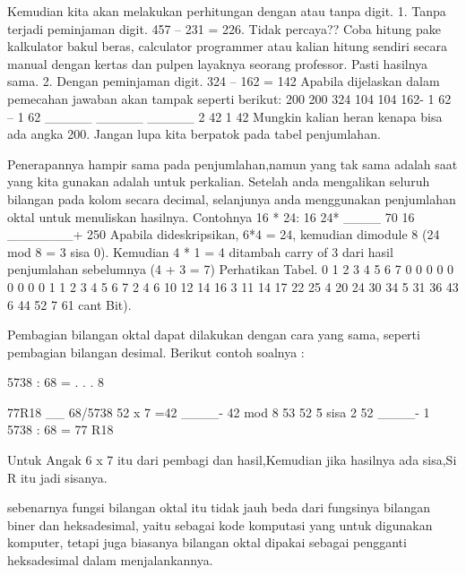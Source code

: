 Kemudian kita akan melakukan perhitungan dengan atau tanpa digit.  
1.	Tanpa terjadi peminjaman digit.
457 – 231 = 226. Tidak percaya?? Coba hitung pake kalkulator bakul beras, calculator programmer atau kalian hitung sendiri secara manual dengan kertas dan pulpen layaknya seorang professor. Pasti hasilnya sama.
2.	Dengan peminjaman digit.
324 – 162 = 142
Apabila dijelaskan dalam pemecahan jawaban akan tampak seperti berikut:
                                200                                         200
324                           104                                          104
162-                       1  62 –                                    1   62
_____                   _____                                   _____
    2                              42                                       1   42
Mungkin kalian heran kenapa bisa ada angka 200. Jangan lupa kita berpatok pada tabel penjumlahan.
	
Penerapannya hampir sama pada penjumlahan,namun yang tak sama adalah saat yang kita gunakan adalah untuk perkalian. Setelah anda mengalikan seluruh bilangan pada kolom secara decimal, selanjunya anda menggunakan penjumlahan oktal untuk menuliskan hasilnya.
Contohnya 16 * 24:
16
24*
____
                70
             16
            _______+
            250
Apabila dideskripsikan, 6*4 = 24, kemudian dimodule 8 (24 mod 8 = 3 sisa 0). Kemudian 4 * 1 = 4 ditambah carry of 3 dari hasil penjumlahan sebelumnya (4 + 3 = 7)
Perhatikan Tabel.
0	1	2	3	4	5	6	7
0	0	0	0	0	0	0	0	0
1	1	2	3	4	5	6	7
2	4	6	10	12	14	16
3	11	14	17	22	25
4	20	24	30	34
5	31	36	43
6	44	52
7	61
cant Bit).

Pembagian bilangan oktal dapat dilakukan dengan cara yang sama, seperti pembagian bilangan desimal.
Berikut contoh soalnya :
	
5738 :  68 = . . . 8	
	 
	   77R18
	   __
	68/5738
	   52		\-\- x 7 =42
	   ____-	42 mod 8
	    53
	    52		\-\-\> \= 5 sisa 2 52
	   ____-
	   	 1
5738 : 68 = 77 R18

Untuk Angak 6 x 7 itu dari pembagi dan hasil,Kemudian jika hasilnya ada sisa,Si R itu jadi sisanya.


sebenarnya fungsi bilangan oktal itu tidak jauh beda dari fungsinya bilangan biner dan heksadesimal, yaitu sebagai kode komputasi yang untuk digunakan komputer, tetapi juga biasanya bilangan oktal dipakai sebagai pengganti heksadesimal dalam menjalankannya.

